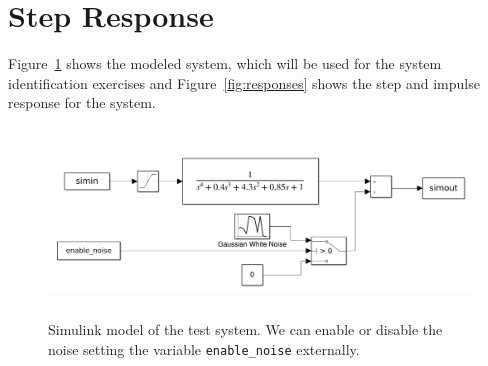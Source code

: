 \documentclass{scrartcl}
\begin{document}
\section{Step Response}
Figure~\ref{fig:testmodel} shows the modeled system, which will be used for the system identification exercises and
Figure~\ref{fig:responses} shows the step and impulse response for the system. 
\begin{figure}[h]
	\centering
	\includegraphics[height=5cm]{figures/systemmodel.png}
	\caption{Simulink model of the test system. We can enable or disable the noise setting the variable \texttt{enable\_noise} externally.}\label{fig:testmodel}
\end{figure}
\end{document}
